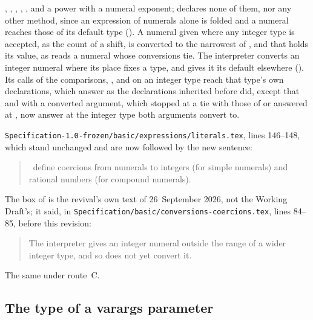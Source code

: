 \begin{description}
, , , , ,
 and a power with a numeral exponent;  declares
none of them, nor any other method, since an expression of numerals alone is
folded and a numeral reaches those of its default type
().
A numeral given where any integer type is accepted, as the count of a shift,
is converted to the narrowest of ,  and
 that holds its value, as  reads a
numeral whose conversions tie.
The interpreter converts an integer numeral where its place fixes a type, and
gives it its default elsewhere ().
Its calls of the comparisons, ,  and  on an
integer type reach that type's own declarations, which answer as the
declarations inherited before did, except that  and 
with a converted argument, which stopped at a tie with those of
 or answered at , now answer at the integer
type both arguments convert to.
\item[Original text] \nolinkurl{Specification-1.0-frozen/basic/expressions/literals.tex},
lines 146--148, which stand unchanged and are now followed by the new
sentence:
\begin{quote}
\Library\ define coercions
from numerals to integers (for simple numerals)
and rational numbers (for compound numerals).
\end{quote}
The box of  is the revival's own text of 26~September 2026,
not the Working Draft's; it said, in
\nolinkurl{Specification/basic/conversions-coercions.tex}, lines 84--85,
before this revision:
\begin{quote}
The interpreter gives an integer numeral outside the range of 
a wider integer type, and so does not yet convert it.
\end{quote}
\item[Route C] The same under route~C.
\end{description}

\subsection{The type of a varargs parameter}

